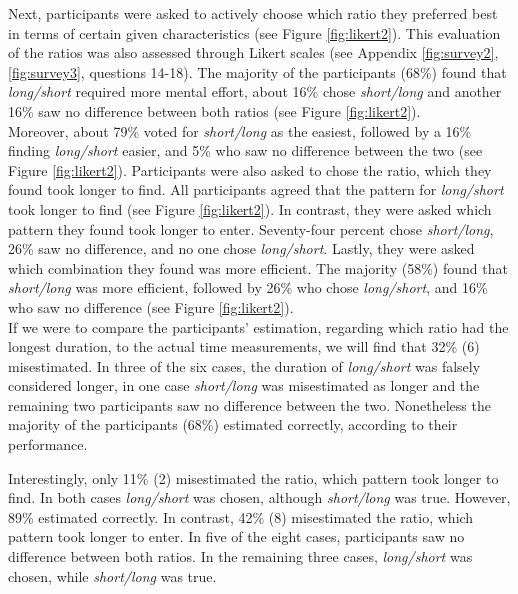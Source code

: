 Next, participants were asked to actively choose which ratio they preferred best in terms of certain given characteristics (see Figure \ref{fig:likert2}). This evaluation of the ratios was also assessed through Likert scales (see Appendix \ref{fig:survey2}, \ref{fig:survey3}, questions 14-18). The majority of the participants (68\%) found that \textit{long/short} required more mental effort, about 16\% chose \textit{short/long} and another 16\% saw no difference between both ratios (see Figure \ref{fig:likert2}). \\
Moreover, about 79\% voted for \textit{short/long} as the easiest, followed by a 16\% finding \textit{long/short} easier, and 5\% who saw no difference between the two (see Figure \ref{fig:likert2}). Participants were also asked to chose the ratio, which they found took longer to find. All participants agreed that the pattern for \textit{long/short} took longer to find (see Figure \ref{fig:likert2}). In contrast, they were asked which pattern they found took longer to enter. Seventy-four percent chose \textit{short/long}, 26\% saw no difference, and no one chose \textit{long/short}. Lastly, they were asked which combination they found was more efficient. The majority (58\%) found that \textit{short/long} was more efficient, followed by 26\% who chose \textit{long/short}, and 16\% who saw no difference (see Figure \ref{fig:likert2}).\\

If we were to compare the participants' estimation, regarding which ratio had the longest duration, to the actual time measurements, we will find that 32\% (6) misestimated. In three of the six cases, the duration of \textit{long/short} was falsely  considered longer, in one case \textit{short/long} was misestimated as longer and the remaining two participants saw no difference between the two. Nonetheless the majority of the participants (68\%) estimated correctly, according to their performance.

Interestingly, only 11\% (2) misestimated the ratio, which pattern took longer to find. In both cases \textit{long/short} was chosen, although \textit{short/long} was true. However, 89\% estimated correctly. In contrast, 42\% (8) misestimated the ratio, which pattern took longer to enter. In five of the eight cases, participants saw no difference between both ratios. In the remaining three cases, \textit{long/short} was chosen, while \textit{short/long} was true. 


